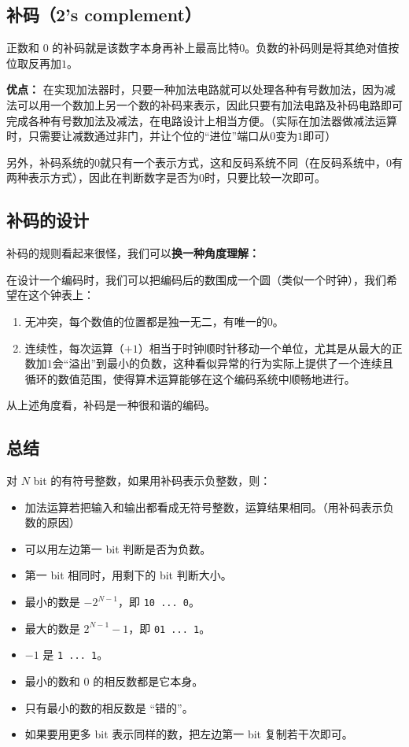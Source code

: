 \subsection{补码（2's complement）}

正数和 $0$ 的补码就是该数字本身再补上最高比特$0$。负数的补码则是将其绝对值按位取反再加$1$。

\textbf{优点：}
在实现加法器时，只要一种加法电路就可以处理各种有号数加法，因为减法可以用一个数加上另一个数的补码来表示，因此只要有加法电路及补码电路即可完成各种有号数加法及减法，在电路设计上相当方便。（实际在加法器做减法运算时，只需要让减数通过非门，并让个位的“进位”端口从$0$变为$1$即可）

另外，补码系统的$0$就只有一个表示方式，这和反码系统不同（在反码系统中，$0$有两种表示方式），因此在判断数字是否为$0$时，只要比较一次即可。


\subsection{补码的设计}

补码的规则看起来很怪，我们可以\textbf{换一种角度理解：}

在设计一个编码时，我们可以把编码后的数围成一个圆（类似一个时钟），我们希望在这个钟表上：
\begin{enumerate}
\item 
无冲突，每个数值的位置都是独一无二，有唯一的$0$。
\item 
连续性，每次运算（$+1$）相当于时钟顺时针移动一个单位，尤其是从最大的正数加$1$会“溢出”到最小的负数，这种看似异常的行为实际上提供了一个连续且循环的数值范围，使得算术运算能够在这个编码系统中顺畅地进行。
\end{enumerate}

从上述角度看，补码是一种很和谐的编码。


\subsection{总结}
对 $N$ bit 的有符号整数，如果用补码表示负整数，则：
\begin{itemize}
\item 加法运算若把输入和输出都看成无符号整数，运算结果相同。（用补码表示负数的原因）
\item 可以用左边第一 bit 判断是否为负数。
\item 第一 bit 相同时，用剩下的 bit 判断大小。
\item 最小的数是 $-2^{N-1}$，即 \verb`10 ... 0`。
\item 最大的数是 $2^{N-1}-1$，即 \verb`01 ... 1`。
\item $-1$ 是 \verb`1 ... 1`。
\item 最小的数和 $0$ 的相反数都是它本身。
\item 只有最小的数的相反数是 “错的”。
\item 如果要用更多 bit 表示同样的数，把左边第一 bit 复制若干次即可。
\end{itemize}
